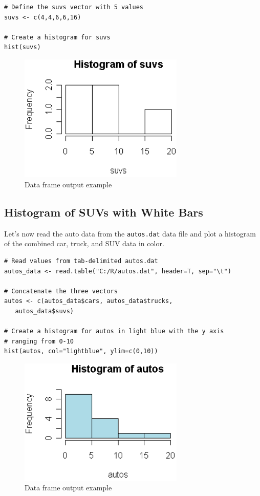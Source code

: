 \documentclass[10pt]{book}
\begin{document}
\begin{lstlisting}
# Define the suvs vector with 5 values
suvs <- c(4,4,6,6,16)

# Create a histogram for suvs
hist(suvs)
\end{lstlisting}
\begin{figure}[H]
    \begin{flushleft}
        \includegraphics[width=0.7\textwidth]{hist_script1.png}
        \caption{Data frame output example}
        \label{fig:dataframe}
    \end{flushleft}
\end{figure}

\subsection*{Histogram of SUVs with White Bars}
Let's now read the auto data from the \texttt{autos.dat} data file and plot a histogram of the combined car, truck, and SUV data in color.

\begin{lstlisting}
# Read values from tab-delimited autos.dat
autos_data <- read.table("C:/R/autos.dat", header=T, sep="\t")

# Concatenate the three vectors
autos <- c(autos_data$cars, autos_data$trucks, 
   autos_data$suvs)

# Create a histogram for autos in light blue with the y axis
# ranging from 0-10
hist(autos, col="lightblue", ylim=c(0,10))
\end{lstlisting}
\begin{figure}[H]
    \begin{flushleft}
        \includegraphics[width=0.7\textwidth]{hist_script2.png}
        \caption{Data frame output example}
        \label{fig:dataframe}
    \end{flushleft}
\end{figure}
\end{document}
